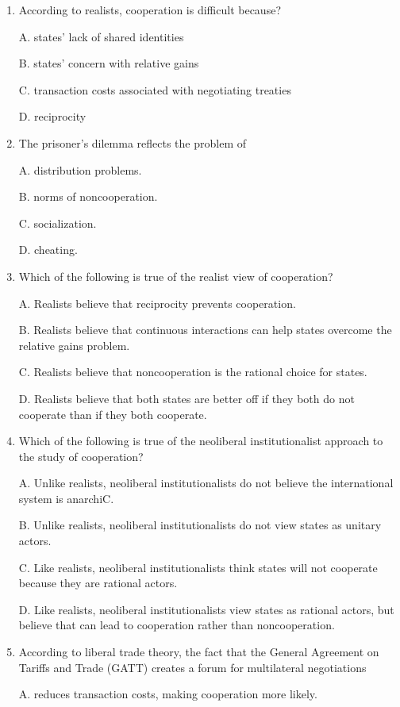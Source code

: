 \documentclass[
]{book}
\begin{document}
\begin{enumerate}
\def\labelenumi{\arabic{enumi}.}
\item
  According to realists, cooperation is difficult because?

  A. states' lack of shared identities

  B. states' concern with relative gains

  C. transaction costs associated with negotiating treaties

  D. reciprocity
\item
  The prisoner's dilemma reflects the problem of

  A. distribution problems.

  B. norms of noncooperation.

  C. socialization.

  D. cheating.
\item
  Which of the following is true of the realist view of cooperation?

  A. Realists believe that reciprocity prevents cooperation.

  B. Realists believe that continuous interactions can help states overcome the relative gains problem.

  C. Realists believe that noncooperation is the rational choice for states.

  D. Realists believe that both states are better off if they both do not cooperate than if they both cooperate.
\item
  Which of the following is true of the neoliberal institutionalist approach to the study of cooperation?

  A. Unlike realists, neoliberal institutionalists do not believe the international system is anarchiC.

  B. Unlike realists, neoliberal institutionalists do not view states as unitary actors.

  C. Like realists, neoliberal institutionalists think states will not cooperate because they are rational actors.

  D. Like realists, neoliberal institutionalists view states as rational actors, but believe that can lead to cooperation rather than noncooperation.
\item
  According to liberal trade theory, the fact that the General Agreement on Tariffs and Trade (GATT) creates a forum for multilateral negotiations

  A. reduces transaction costs, making cooperation more likely.


\end{enumerate}
\end{document}
